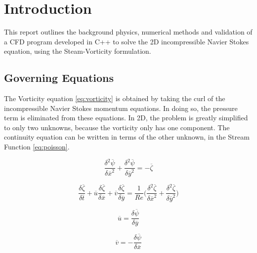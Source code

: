 \chapter{Introduction}

This report outlines the background physics, numerical methods and validation of a CFD program developed in C++ to solve the 2D incompressible Navier Stokes equation, using the Steam-Vorticity formulation.


\section{Governing Equations}
\label{sec:gov_eqs}

The Vorticity equation \ref{eq:vorticity} is obtained by taking the curl of the incompressible Navier Stokes momentum equations.  In doing so, the pressure term is eliminated from these equations.  In 2D, the problem is greatly simplified to only two unknowns, because the vorticity only has one component.  The continuity equation can be written in terms of the other unknown, in the Stream Function \ref{eq:poisson}.  


\begin{equation}
\label{eq:poisson} 
\frac{\delta^2 \overline{\psi}}{\delta \overline{x}^2} + \frac{\delta^2 \overline{\psi}}{\delta \overline{y}^2} = -\overline{\zeta}
\end{equation}

\begin{equation}
\label{eq:vorticity} 
              \frac { \delta \overline{\zeta}}{\delta \overline{t}} + 
\overline{u} \frac{\delta \overline{\zeta}}{\delta \overline{x}} + 
\overline{v} \frac{\delta \overline{\zeta}}{\delta \overline{y}} = 
\frac{1}{Re} \Big(\frac{\delta^2 \overline{\zeta}}{\delta \overline{x}^2} + 
\frac{\delta^2 \overline{\zeta}}{\delta \overline{y}^2} \Big)
\end{equation}




\noindent\begin{minipage}{.5\linewidth}
\begin{equation}
\label{eq:u}        
\overline{u} =  \frac{\delta \overline{\psi}}{\delta \overline{y}} 
\end{equation}
\end{minipage}%
\begin{minipage}{.5\linewidth}
\begin{equation}
\label{eq:v} 
\overline{v} = - \frac{\delta \overline{\psi}}{\delta \overline{x}}
\end{equation}
\end{minipage}


